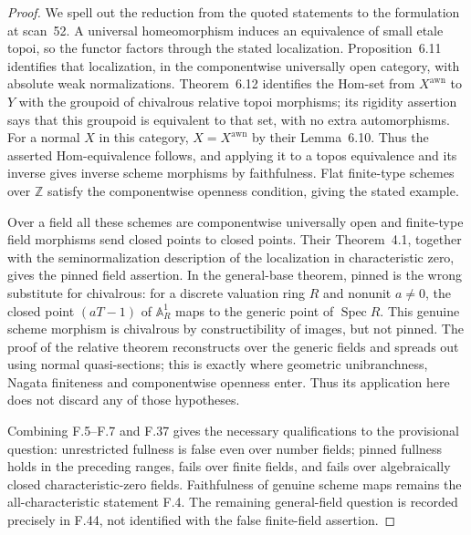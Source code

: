 \begin{proof}
We spell out the reduction from the quoted statements to the formulation
at scan~52. A universal homeomorphism induces an equivalence of small
etale topoi, so the functor factors through the stated localization.
Proposition~6.11 identifies that localization, in the componentwise
universally open category, with absolute weak normalizations. Theorem~6.12
identifies the Hom-set from $X^{\mathrm{awn}}$ to $Y$ with the groupoid
of chivalrous relative topoi morphisms; its rigidity assertion says that
this groupoid is equivalent to that set, with no extra automorphisms.
For a normal $X$ in this category, $X=X^{\mathrm{awn}}$ by their
Lemma~6.10. Thus the asserted Hom-equivalence follows, and applying it
to a topos equivalence and its inverse gives inverse scheme morphisms
by faithfulness. Flat finite-type schemes over $\mathbb Z$ satisfy the
componentwise openness condition, giving the stated example.

Over a field all these schemes are componentwise universally open and
finite-type field morphisms send closed points to closed points. Their
Theorem~4.1, together with the seminormalization description of the
localization in characteristic zero, gives the pinned field assertion.
In the general-base theorem, pinned is the wrong substitute for
chivalrous: for a discrete valuation ring $R$ and nonunit $a\ne0$, the
closed point $(aT-1)$ of $\mathbb A^1_R$ maps to the generic point of
$\operatorname{Spec}R$. This genuine scheme morphism is chivalrous by
constructibility of images, but not pinned. The proof of the relative
theorem reconstructs over the generic fields and spreads out using
normal quasi-sections; this is exactly where geometric unibranchness,
Nagata finiteness and componentwise openness enter. Thus its application
here does not discard any of those hypotheses.

Combining F.5--F.7 and F.37 gives the necessary qualifications to the
provisional question: unrestricted fullness is false even over number
fields; pinned fullness holds in the preceding ranges, fails over finite
fields, and fails over algebraically closed characteristic-zero fields.
Faithfulness of genuine scheme maps remains the all-characteristic
statement F.4. The remaining general-field question is recorded precisely
in F.44, not identified with the false finite-field assertion.
\end{proof}


